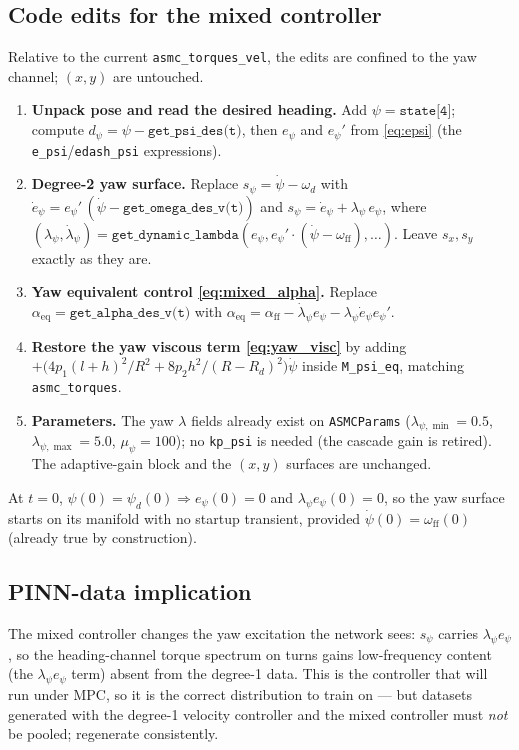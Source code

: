 \documentclass[11pt]{article}
\theoremstyle{plain}
\theoremstyle{definition}
\begin{document}
\subsection{Code edits for the mixed controller}
\label{sec:mixed_code}
Relative to the current \texttt{asmc\_torques\_vel}, the edits are confined to the yaw
channel; $(x,y)$ are untouched.
\begin{enumerate}[leftmargin=2em]
\item \textbf{Unpack pose and read the desired heading.} Add $\psi=\texttt{state[4]}$;
compute $d_\psi=\psi-\texttt{get\_psi\_des(t)}$, then $e_\psi$ and $e_\psi'$ from
\eqref{eq:epsi} (the \texttt{e\_psi}/\texttt{edash\_psi} expressions).
\item \textbf{Degree-2 yaw surface.} Replace $s_\psi=\dot\psi-\omega_d$ with
$\dot e_\psi=e_\psi'\,(\dot\psi-\texttt{get\_omega\_des\_v(t)})$ and
$s_\psi=\dot e_\psi+\lambda_\psi\,e_\psi$, where $(\lambda_\psi,\dot\lambda_\psi)=
\texttt{get\_dynamic\_lambda}(e_\psi,e_\psi'\!\cdot\!(\dot\psi-\omega_{\mathrm{ff}}),
\dots)$. Leave $s_x,s_y$ exactly as they are.
\item \textbf{Yaw equivalent control \eqref{eq:mixed_alpha}.} Replace
$\alpha_{\mathrm{eq}}=\texttt{get\_alpha\_des\_v(t)}$ with
$\alpha_{\mathrm{eq}}=\alpha_{\mathrm{ff}}-\dot\lambda_\psi e_\psi-\lambda_\psi\dot
e_\psi e_\psi'$.
\item \textbf{Restore the yaw viscous term \eqref{eq:yaw_visc}} by adding
$+\big(4p_1(l+h)^2/R^2+8p_2h^2/(R-R_d)^2\big)\dot\psi$ inside \texttt{M\_psi\_eq}, matching
\texttt{asmc\_torques}.
\item \textbf{Parameters.} The yaw $\lambda$ fields already exist on
\texttt{ASMCParams} ($\lambda_{\psi,\min}{=}0.5$, $\lambda_{\psi,\max}{=}5.0$,
$\mu_\psi{=}100$); no \texttt{kp\_psi} is needed (the cascade gain is retired). The
adaptive-gain block and the $(x,y)$ surfaces are unchanged.
\end{enumerate}
At $t=0$, $\psi(0)=\psi_d(0)\Rightarrow e_\psi(0)=0$ and $\lambda_\psi e_\psi(0)=0$, so
the yaw surface starts on its manifold with no startup transient, provided
$\dot\psi(0)=\omega_{\mathrm{ff}}(0)$ (already true by construction).

\subsection{PINN-data implication}
The mixed controller changes the yaw excitation the network sees: $s_\psi$ carries
$\lambda_\psi e_\psi$, so the heading-channel torque spectrum on turns gains
low-frequency content (the $\lambda_\psi e_\psi$ term) absent from the degree-1 data.
This is the controller that will run under MPC, so it is the correct distribution to
train on --- but datasets generated with the degree-1 velocity controller and the
mixed controller must \emph{not} be pooled; regenerate consistently.
\end{document}
